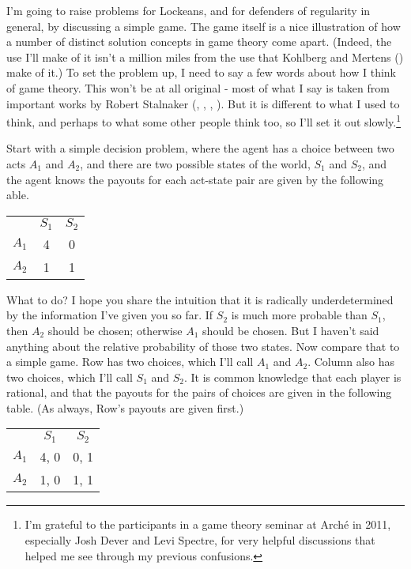 \documentclass[
  10pt,
  letterpaper,
  DIV=11,
  numbers=noendperiod,
  twoside]{scrartcl}
\begin{document}
I'm going to raise problems for Lockeans, and for defenders of
regularity in general, by discussing a simple game. The game itself is a
nice illustration of how a number of distinct solution concepts in game
theory come apart. (Indeed, the use I'll make of it isn't a million
miles from the use that Kohlberg and Mertens
() make of it.) To set the
problem up, I need to say a few words about how I think of game theory.
This won't be at all original - most of what I say is taken from
important works by Robert Stalnaker (,
, ,
). But it is different to what I used
to think, and perhaps to what some other people think too, so I'll set
it out slowly.\footnote{I'm grateful to the participants in a game
  theory seminar at Arché in 2011, especially Josh Dever and Levi
  Spectre, for very helpful discussions that helped me see through my
  previous confusions.}

Start with a simple decision problem, where the agent has a choice
between two acts \(A_1\) and \(A_2\), and there are two possible states
of the world, \(S_1\) and \(S_2\), and the agent knows the payouts for
each act-state pair are given by the following able.

\begin{longtable}[]{@{}lcc@{}}
\toprule\noalign{}
\endhead
\bottomrule\noalign{}
\endlastfoot
& \(S_1\) & \(S_2\) \\
\(A_1\) & 4 & 0 \\
\(A_2\) & 1 & 1 \\
\end{longtable}

What to do? I hope you share the intuition that it is radically
underdetermined by the information I've given you so far. If \(S_2\) is
much more probable than \(S_1\), then \(A_2\) should be chosen;
otherwise \(A_1\) should be chosen. But I haven't said anything about
the relative probability of those two states. Now compare that to a
simple game. Row has two choices, which I'll call \(A_1\) and \(A_2\).
Column also has two choices, which I'll call \(S_1\) and \(S_2\). It is
common knowledge that each player is rational, and that the payouts for
the pairs of choices are given in the following table. (As always, Row's
payouts are given first.)

\begin{longtable}[]{@{}lcc@{}}
\toprule\noalign{}
\endhead
\bottomrule\noalign{}
\endlastfoot
& \(S_1\) & \(S_2\) \\
\(A_1\) & 4, 0 & 0, 1 \\
\(A_2\) & 1, 0 & 1, 1 \\
\end{longtable}
\end{document}

